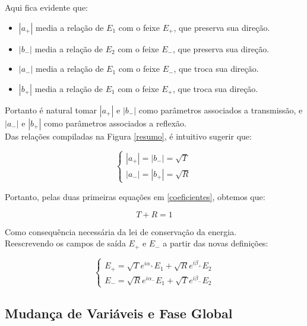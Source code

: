 \documentclass[12pt,a4paper]{report}
\begin{document}
Aqui fica evidente que:

\begin{itemize}
    \item $|a_+|$ media a relação de $E_1$ com o feixe $E_+$, que preserva sua direção.
    \item $|b_-|$ media a relação de $E_2$ com o feixe $E_-$, que preserva sua direção.
    \item $|a_-|$ media a relação de $E_1$ com o feixe $E_-$, que troca sua direção.
    \item $|b_+|$ media a relação de $E_1$ com o feixe $E_+$, que troca sua direção.
\end{itemize}

Portanto é natural tomar $|a_+|$ e $|b_-|$ como parâmetros associados a transmissão, e $|a_-|$ e $|b_+|$ como parâmetros associados a reflexão.\\

Das relações compiladas na Figura \ref{resumo}, é intuitivo sugerir que:

\begin{equation*}
    \begin{cases}
        |a_+|=|b_-|=\sqrt{T}\\
        |a_-|=|b_+|=\sqrt{R}
    \end{cases}
\end{equation*}

Portanto, pelas duas primeiras equações em \ref{coeficientes}, obtemos que:

\begin{equation}
    \boxed{T+R=1}
\end{equation}

Como consequência necessária da lei de conservação da energia.\\

Reescrevendo os campos de saída $E_+$ e $E_-$ a partir das novas definições:

\begin{equation}
    \begin{cases}
        E_+=\sqrt{T}e^{i\alpha_+}E_1+\sqrt{R}e^{i\beta_+}E_2\\
        E_-=\sqrt{R}e^{i\alpha_-}E_1+\sqrt{T}e^{i\beta_-
        }E_2
    \end{cases}
    \label{campos}
\end{equation}

\subsection{Mudança de Variáveis e Fase Global}
\end{document}
